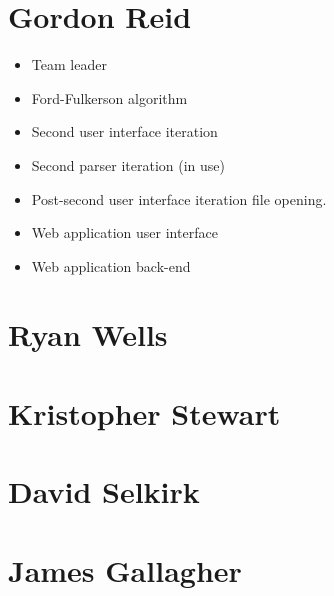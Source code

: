 \section{Gordon Reid}

\begin{itemize}
\item Team leader
\item Ford-Fulkerson algorithm
\item Second user interface iteration
\item Second parser iteration (in use)
\item Post-second user interface iteration file opening.
\item Web application user interface
\item Web application back-end
\end{itemize}

\section{Ryan Wells}

\section{Kristopher Stewart}

\section{David Selkirk}

\section{James Gallagher}